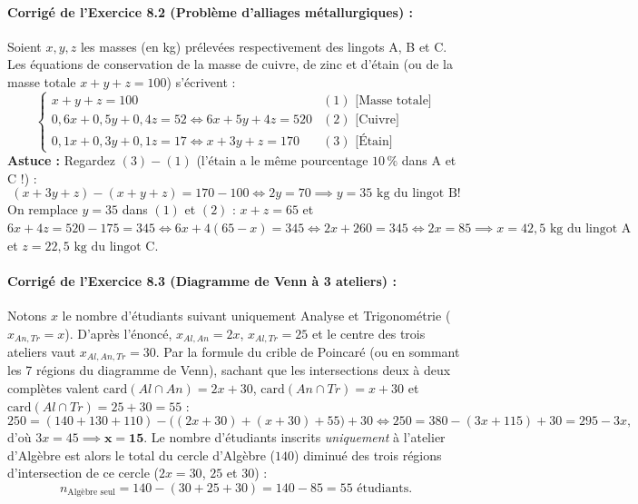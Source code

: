 \paragraph{Corrigé de l'Exercice 8.2 (Problème d'alliages métallurgiques) :}
Soient $x, y, z$ les masses (en kg) prélevées respectivement des lingots A, B et C. Les équations de conservation de la masse de cuivre, de zinc et d'étain (ou de la masse totale $x + y + z = 100$) s'écrivent :
\[
    \begin{cases}
        x + y + z = 100 & (1) \text{ [Masse totale]} \\
        0,6x + 0,5y + 0,4z = 52 \iff 6x + 5y + 4z = 520 & (2) \text{ [Cuivre]} \\
        0,1x + 0,3y + 0,1z = 17 \iff x + 3y + z = 170 & (3) \text{ [Étain]}
    \end{cases}
\]
\textbf{Astuce :} Regardez $(3) - (1)$ (l'étain a le même pourcentage $10\,\%$ dans A et C !) :
\[
    (x + 3y + z) - (x + y + z) = 170 - 100 \iff 2y = 70 \implies \boxed{y = 35\text{ kg du lingot B}} !
\]
On remplace $y = 35$ dans $(1)$ et $(2)$ : $x + z = 65$ et $6x + 4z = 520 - 175 = 345 \iff 6x + 4(65 - x) = 345 \iff 2x + 260 = 345 \iff 2x = 85 \implies \boxed{x = 42,5\text{ kg du lingot A}}$ et $\boxed{z = 22,5\text{ kg du lingot C}}$.

\paragraph{Corrigé de l'Exercice 8.3 (Diagramme de Venn à 3 ateliers) :}
Notons $x$ le nombre d'étudiants suivant uniquement Analyse et Trigonométrie ($x_{An,Tr} = x$). D'après l'énoncé, $x_{Al,An} = 2x$, $x_{Al,Tr} = 25$ et le centre des trois ateliers vaut $x_{Al,An,Tr} = 30$.
Par la formule du crible de Poincaré (ou en sommant les 7 régions du diagramme de Venn), sachant que les intersections deux à deux complètes valent $\text{card}(Al \cap An) = 2x + 30$, $\text{card}(An \cap Tr) = x + 30$ et $\text{card}(Al \cap Tr) = 25 + 30 = 55$ :
\[
    250 = (140 + 130 + 110) - \bigl((2x + 30) + (x + 30) + 55\bigr) + 30 \iff 250 = 380 - (3x + 115) + 30 = 295 - 3x,
\]
d'où $3x = 45 \implies \mathbf{x = 15}$.
Le nombre d'étudiants inscrits \emph{uniquement} à l'atelier d'Algèbre est alors le total du cercle d'Algèbre ($140$) diminué des trois régions d'intersection de ce cercle ($2x = 30$, $25$ et $30$) :
\[
    n_{\text{Algèbre seul}} = 140 - (30 + 25 + 30) = 140 - 85 = \boxed{55\text{ étudiants}}.
\]
